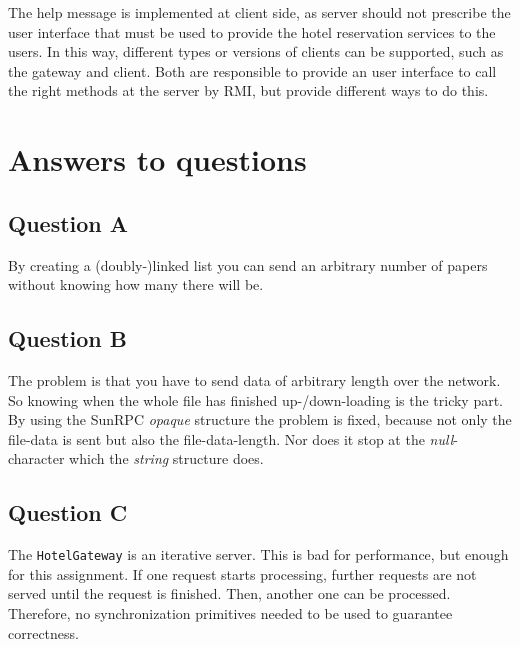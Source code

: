 \documentclass[11pt]{article}
\begin{document}
The help message is implemented at client side, as server should not prescribe the user interface that must be used to provide the hotel reservation services to the users. In this way, different types or versions of clients can be supported, such as the gateway and client. Both are responsible to provide an user interface to call the right methods at the server by RMI, but provide different ways to do this.

\section{Answers to questions}
\subsection{Question A}
By creating a (doubly-)linked list you can send an arbitrary number of papers without knowing how many there will be.
\subsection{Question B}
The problem is that you have to send data of arbitrary length over the network. So knowing when the whole file has finished up-/down-loading is the tricky part. By using the SunRPC \textit{opaque} structure the problem is fixed, because not only the file-data is sent but also the file-data-length. Nor does it stop at the \textit{null}-character which the \textit{string} structure does.
\subsection{Question C}

The \texttt{HotelGateway} is an iterative server. This is bad for performance, but enough for this assignment. If one request starts processing, further requests are not served until the request is finished. Then, another one can be processed. Therefore, no synchronization primitives needed to be used to guarantee correctness.
\end{document}
